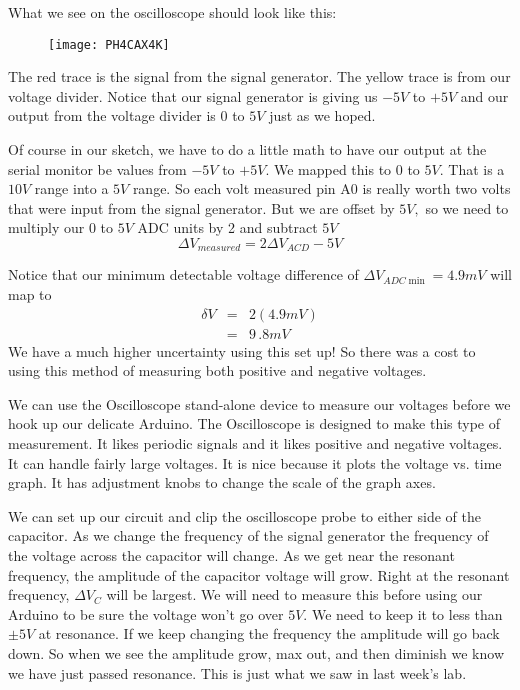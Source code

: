 What we see on the oscilloscope should look like this: \begin{figure}[h!]
\texttt{[image: PH4CAX4K]}
\end{figure}The red trace is the signal from
the signal generator. The yellow trace is from our voltage divider. Notice
that our signal generator is giving us $-5\unit{V}$ to $+5\unit{V}$ and our
output from the voltage divider is $0$ to $5\unit{V}$ just as we hoped.

Of course in our sketch, we have to do a little math to have our output at
the serial monitor be values from $-5\unit{V}$ to $+5\unit{V}.$ We mapped
this to $0$ to $5\unit{V}.$ That is a $10\unit{V}$ range into a $5\unit{V}$
range. So each volt measured pin A0 is really worth two volts that were
input from the signal generator. But we are offset by $5\unit{V},$ so we
need to multiply our $0$ to $5\unit{V}$ ADC units by 2 and subtract $5\unit{V%
}$%
\begin{equation*}
\Delta V_{measured}=2\Delta V_{ACD}-5\unit{V}
\end{equation*}

\bigskip

Notice that our minimum detectable voltage difference of $\Delta V_{ADC\min
}=4.9\unit{mV}$ will map to 
\begin{eqnarray*}
\delta V &=&2\left( 4.9\unit{mV}\right) \\
&=&9\,.8\unit{mV}
\end{eqnarray*}%
We have a much higher uncertainty using this set up! So there was a cost to
using this method of measuring both positive and negative voltages.

We can use the Oscilloscope stand-alone device to measure our voltages
before we hook up our delicate Arduino. The Oscilloscope is designed to make
this type of measurement. It likes periodic signals and it likes positive
and negative voltages. It can handle fairly large voltages. It is nice
because it plots the voltage vs. time graph. It has adjustment knobs to
change the scale of the graph axes.

We can set up our circuit and clip the oscilloscope probe to either side of
the capacitor. As we change the frequency of the signal generator the
frequency of the voltage across the capacitor will change. As we get near
the resonant frequency, the amplitude of the capacitor voltage will grow.
Right at the resonant frequency, $\Delta V_{C}$ will be largest. We will
need to measure this before using our Arduino to be sure the voltage won't
go over $5\unit{V}$. We need to keep it to less than $\pm 5\unit{V}$ at
resonance. If we keep changing the frequency the amplitude will go back
down. So when we see the amplitude grow, max out, and then diminish we know
we have just passed resonance. This is just what we saw in last week's lab.

